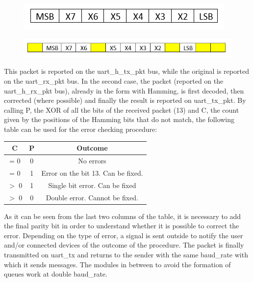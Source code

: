 \documentclass[11pt]{article}
\begin{document}
	\begin{figure}[H]
	\begin{center}
		\includegraphics{p1}		
	\end{center}
	\end{figure}
	\begin{figure}[H]
	\begin{center}
		\includegraphics{p2}		
	\end{center}
	\end{figure}
	This packet is reported on the uart\_h\_tx\_pkt bus, while the original is reported on the uart\_rx\_pkt bus.
	In the second case, the packet (reported on the uart\_h\_rx\_pkt bus), already in the form with Hamming, is first decoded, then corrected (where possible) and finally the result is reported on uart\_tx\_pkt. By calling P, the XOR of all the bits of the received packet (13) and C, the count given by the positions of the Hamming bits that do not match, the following table can be used for the error checking procedure:
	\begin{center}
		\begin{tabular} {|c|c|c|}
		\hline
		C & P & Outcome\\
		\hline
		\hline
		= 0 & 0 & No errors\\
		= 0 & 1 & Error on the bit 13. Can be fixed.\\
		$>$ 0	& 1	& Single bit error. Can be fixed\\
		$>$ 0 & 0 & Double error. Cannot be fixed.\\
		\hline
		\end{tabular}
	\end{center}
	As it can be seen from the last two columns of the table, it is necessary to add the final parity bit in order to understand whether it is possible to correct the error.
	Depending on the type of error, a signal is sent outside to notify the user and/or connected devices of the outcome of the procedure.
	The packet is finally transmitted on uart\_tx and returns to the sender with the same baud\_rate with which it sends messages. The modules in between to avoid the formation of queues work at double baud\_rate.
\end{document}
